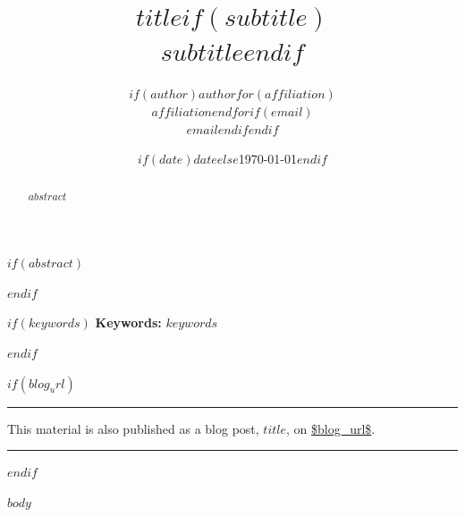 \documentclass[11pt]{article}
\title{\vspace{-2em}$title$$if(subtitle)$\\[0.45em]{\large\normalfont\itshape $subtitle$}$endif$\vspace{-0.4em}}
\author{$if(author)$$author$$for(affiliation)$\\[0.3em]\normalsize $affiliation$$endfor$$if(email)$\\[0.2em]\normalsize\texttt{$email$}$endif$$endif$}
\date{$if(date)$$date$$else$\today$endif$}
\begin{document}
\maketitle
\thispagestyle{plain}

$if(abstract)$
\begin{abstract}
\noindent $abstract$
\end{abstract}
$endif$

$if(keywords)$
\begingroup
\small
\noindent\textbf{Keywords:} $keywords$
\par
\endgroup
\vspace{1em}
$endif$

$if(blog_url)$
\begingroup
\small
\noindent\rule{\linewidth}{0.4pt}\par
\vspace{0.4em}
\noindent This material is also published as a blog post, \emph{$title$}, on
\url{$blog_url$}.\par
\vspace{0.3em}
\noindent\rule{\linewidth}{0.4pt}\par
\endgroup
\vspace{1.2em}
$endif$

$body$
\end{document}
